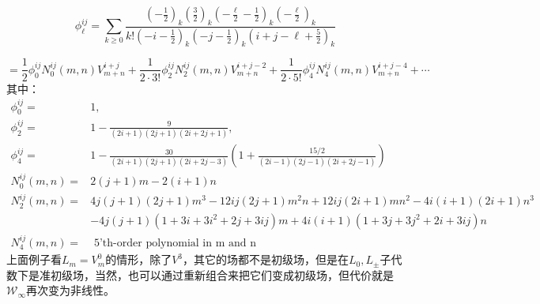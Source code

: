 \begin{equation}
	\phi_\ell^{ij}=\sum_{k\geq0}\frac{(-\frac12)_k(\frac32)_k(-\frac\ell2-\frac12)_k(-\frac\ell2)_k}{k!\left(-i-\frac12\right)_k(-j-\frac12)_k(i+j-\ell+\frac52)_k}
\end{equation}
\begin{example}
	\begin{equation}
		[V_m^i,V_n^j]=\frac12\phi_0^{ij}N_0^{ij}(m,n)V_{m+n}^{i+j}+\frac1{2\cdot3!}\phi_2^{ij}N_2^{ij}(m,n)V_{m+n}^{i+j-2}+\frac1{2\cdot5!}\phi_4^{ij}N_4^{ij}(m,n)V_{m+n}^{i+j-4}+\cdots 
	\end{equation}
	其中：
	\begin{equation}
		\begin{aligned}
			\phi_{0}^{ij} =&1,  \\
			\phi_{2}^{ij} =&1-\frac9{(2i+1)(2j+1)(2i+2j+1)},  \\
			\phi_{4}^{ij} =&1-\frac{30}{(2i+1)(2j+1)(2i+2j-3)}\left(1+\frac{15/2}{(2i-1)(2j-1)(2i+2j-1)}\right) \\
			N_{0}^{{i}j}(m,n) =&2(j{+}1)m{-}2(i{+}1)n\\
			N_2^{ij}(m,n)=&4j(j+1)(2j+1)m^3-12ij(2j+1)m^2n+12ij(2i+1)mn^2-4i(i+1)(2i+1)n^3\\&-4j(j+1)(1+3i+3i^2+2j+3ij)m+4i(i+1)(1+3j+3j^2+2i+3ij)n\\
			N_4^{ij}(m,n)=&\text{ 5'th-order polynomial in m and n}
		\end{aligned}
	\end{equation}
	上面例子看$L_m=V^0_m$的情形，除了$V^3$，其它的场都不是初级场，但是在$L_{0},L_{\pm}$子代数下是准初级场，当然，也可以通过重新组合来把它们变成初级场，但代价就是$\mathcal{W}_\infty$再次变为非线性。
\end{example}
